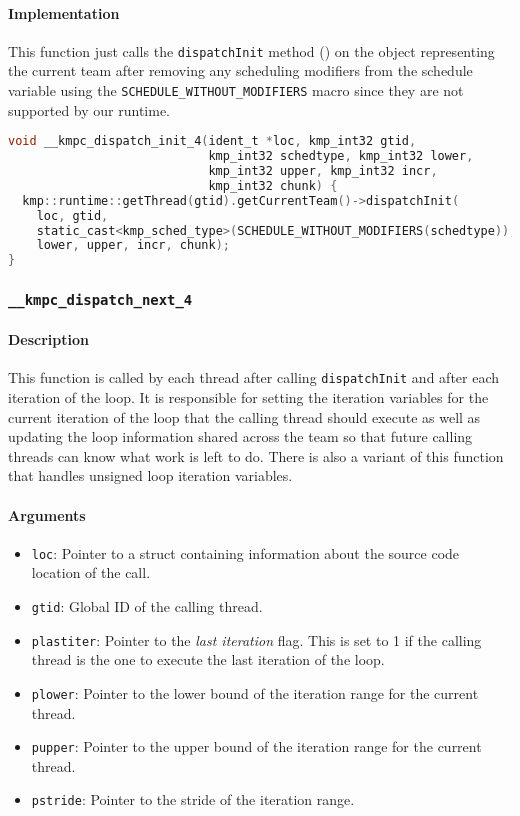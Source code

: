 \paragraph{Implementation} This function just calls the \texttt{dispatchInit} method () on
the object representing the current team after removing any scheduling modifiers from the schedule
variable using the \texttt{SCHEDULE\_WITHOUT\_MODIFIERS} macro since they are not supported by our
runtime.

\begin{lstlisting}[language=C, caption={__kmpc_dispatch_init_4},
                   label={lst:kmpc-dispatch-init-4}, escapechar=@]
void __kmpc_dispatch_init_4(ident_t *loc, kmp_int32 gtid,
                            kmp_int32 schedtype, kmp_int32 lower,
                            kmp_int32 upper, kmp_int32 incr,
                            kmp_int32 chunk) {
  kmp::runtime::getThread(gtid).getCurrentTeam()->dispatchInit(
    loc, gtid,
    static_cast<kmp_sched_type>(SCHEDULE_WITHOUT_MODIFIERS(schedtype)),
    lower, upper, incr, chunk);
}
\end{lstlisting}

\subsubsection{\texttt{__kmpc_dispatch_next_4}}
\label{subsubsec:kmpc-dispatch-next-4}

\paragraph{Description} This function is called by each thread after calling \texttt{dispatchInit}
and after each iteration of the loop. It is responsible for setting the iteration variables for the
current iteration of the loop that the calling thread should execute as well as updating the loop
information shared across the team so that future calling threads can know what work is left to do.
There is also a variant of this function that handles unsigned loop iteration variables.

\paragraph{Arguments}
\begin{itemize}
	\item \texttt{loc}: Pointer to a struct containing information about the source code location
	      of the call.
	\item \texttt{gtid}: Global ID of the calling thread.
	\item \texttt{plastiter}: Pointer to the \emph{last iteration} flag. This is set to 1 if the
	      calling thread is the one to execute the last iteration of the loop.
	\item \texttt{plower}: Pointer to the lower bound of the iteration range for the current thread.
	\item \texttt{pupper}: Pointer to the upper bound of the iteration range for the current thread.
	\item \texttt{pstride}: Pointer to the stride of the iteration range.
\end{itemize}

